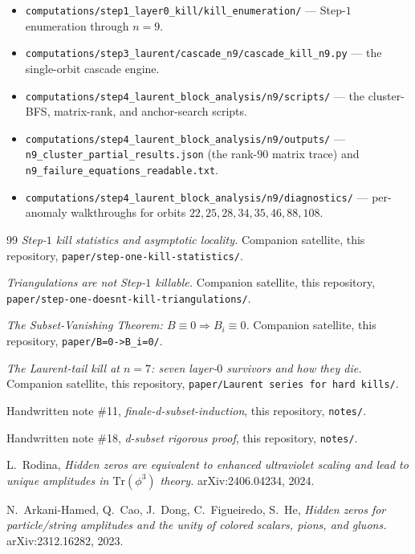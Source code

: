 \documentclass[11pt]{article}
\theoremstyle{definition}
\begin{document}
\begin{itemize}[leftmargin=*]
\item \verb|computations/step1_layer0_kill/kill_enumeration/| ---
Step-$1$ enumeration through $n=9$.
\item \verb|computations/step3_laurent/cascade_n9/cascade_kill_n9.py|
--- the single-orbit cascade engine.
\item \verb|computations/step4_laurent_block_analysis/n9/scripts/| ---
the cluster-BFS, matrix-rank, and anchor-search scripts.
\item \verb|computations/step4_laurent_block_analysis/n9/outputs/| ---
\verb|n9_cluster_partial_results.json| (the rank-$90$ matrix
trace) and \verb|n9_failure_equations_readable.txt|.
\item \verb|computations/step4_laurent_block_analysis/n9/diagnostics/|
--- per-anomaly walkthroughs for orbits $22, 25, 28, 34, 35, 46,
88, 108$.
\end{itemize}

\begin{thebibliography}{99}
\emph{Step-$1$ kill statistics and asymptotic locality.} Companion
satellite, this repository,
\verb|paper/step-one-kill-statistics/|.

\emph{Triangulations are not Step-$1$ killable.} Companion
satellite, this repository,
\verb|paper/step-one-doesnt-kill-triangulations/|.

\emph{The Subset-Vanishing Theorem: $B\equiv 0\Rightarrow
B_i\equiv 0$.} Companion satellite, this repository,
\verb|paper/B=0->B_i=0/|.

\emph{The Laurent-tail kill at $n=7$: seven layer-$0$ survivors
and how they die.} Companion satellite, this repository,
\verb|paper/Laurent series for hard kills/|.

Handwritten note \#11, \emph{finale-d-subset-induction}, this
repository, \verb|notes/|.

Handwritten note \#18, \emph{d-subset rigorous proof}, this
repository, \verb|notes/|.

L.~Rodina, \emph{Hidden zeros are equivalent to enhanced
ultraviolet scaling and lead to unique amplitudes in
$\mathrm{Tr}(\phi^3)$ theory.} arXiv:2406.04234, 2024.

N.~Arkani-Hamed, Q.~Cao, J.~Dong, C.~Figueiredo, S.~He,
\emph{Hidden zeros for particle/string amplitudes and the unity of
colored scalars, pions, and gluons.} arXiv:2312.16282, 2023.
\end{thebibliography}
\end{document}
